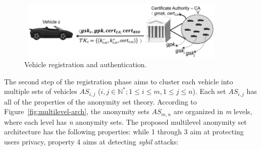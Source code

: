 \documentclass[preprint,12pt]{elsarticle}
\newcommand{\protocolname}{$ASAP$-V}
\begin{document}

\begin{figure}[ht]
\centering
\includegraphics[width=4in, height=1.1in]{figures/registro-veiculo-en.jpg}
\caption{Vehicle registration and authentication.}
\label{fig:vehicle-registration}
\end{figure}

The second step of the registration phase aims to cluster each vehicle into multiple sets of vehicles $AS_{i,j}$ ($i, j \in \mathbb{N}^{*}; 1 \le i \le m, 1 \le j \le n$). Each set $AS_{i,j}$  has all of the properties of the anonymity set theory. According to Figure~\ref{fig:multilevel-arch}, the anonymity sets $AS_{m,n}$ are organized in \textit{m} levels, where each level has \textit{n} anonymity sets. The proposed multilevel anonymity set architecture has the following properties: while 1 through 3 aim at protecting users privacy, property 4 aims at detecting \textit{sybil} attacks:
\end{document}
